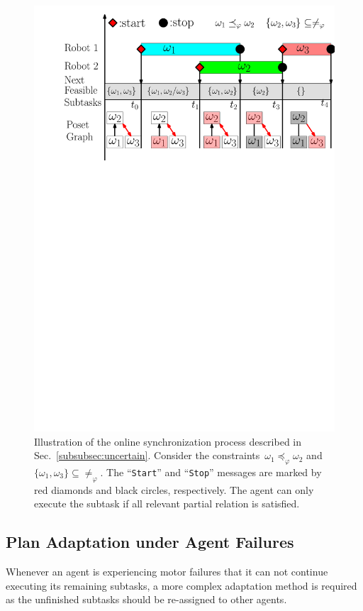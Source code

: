 \begin{figure}[t]
	\centering
	\includegraphics[width=0.8\linewidth]{figures/online_adapt3.pdf}
        \caption{
Illustration of the online synchronization process
described in Sec.~\ref{subsubsec:uncertain}.
Consider the constraints~$\omega_1 \preceq_{\varphi}\omega_2$
and~$\{\omega_1, \omega_3\}\subseteq\neq_\varphi $.
The ``\texttt{Start}'' and ``\texttt{Stop}'' messages are
marked by red diamonds and black circles, respectively. The agent can only
execute the subtask if all relevant partial relation is satisfied.}
\label{fig:online adaption}
\end{figure}


\subsection{Plan Adaptation under Agent Failures}\label{subsubsec:failure}
Whenever an agent is experiencing motor failures that it can not
continue executing its remaining subtasks,
a more complex adaptation method is required as the unfinished subtasks
should be re-assigned to other agents.


